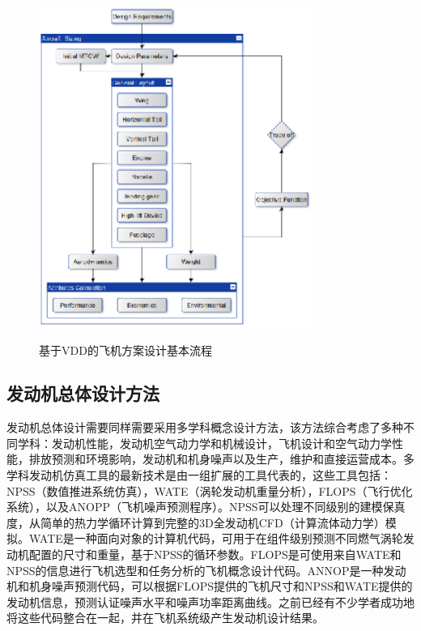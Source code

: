\documentclass[12pt,a4paper]{report}
\begin{document}
\begin{figure}[ht!]
  \centering
  \includegraphics[width=0.8\textwidth]{vdd-aircraft.eps}\\
  \caption{基于VDD的飞机方案设计基本流程}
  \label{fig_vdd_aircraft}
\end{figure}


\subsection{发动机总体设计方法}

发动机总体设计需要同样需要采用多学科概念设计方法，该方法综合考虑了多种不同学科：发动机性能，发动机空气动力学和机械设计，飞机设计和空气动力学性能，排放预测和环境影响，发动机和机身噪声以及生产，维护和直接运营成本。多学科发动机仿真工具的最新技术是由一组扩展的工具代表的，这些工具包括：NPSS（数值推进系统仿真），WATE（涡轮发动机重量分析），FLOPS（飞行优化系统），以及ANOPP（飞机噪声预测程序）。NPSS可以处理不同级别的建模保真度，从简单的热力学循环计算到完整的3D全发动机CFD（计算流体动力学）模拟\cite{lytle2000numerical}。WATE\cite{tong2008an}是一种面向对象的计算机代码，可用于在组件级别预测不同燃气涡轮发动机配置的尺寸和重量，基于NPSS的循环参数。FLOPS\cite{mccullers1984aircraft}是可使用来自WATE和NPSS的信息进行飞机选型和任务分析的飞机概念设计代码。ANNOP\cite{kontos1996improved}是一种发动机和机身噪声预测代码，可以根据FLOPS提供的飞机尺寸和NPSS和WATE提供的发动机信息，预测认证噪声水平和噪声功率距离曲线。之前已经有不少学者成功地将这些代码整合在一起，并在飞机系统级产生发动机设计结果。
\end{document}
